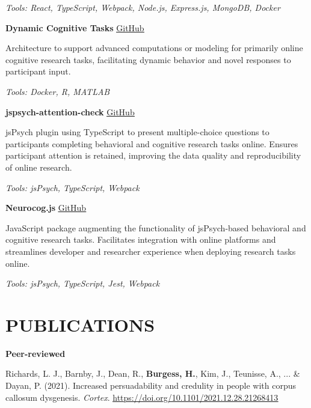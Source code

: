 \documentclass{article}
\begin{document}
  \textit{Tools: React, TypeScript, Webpack, Node.js, Express.js, MongoDB, Docker}

  \medbreak

  \textbf{Dynamic Cognitive Tasks} \hfill \href{https://github.com/Brain-Development-and-Disorders-Lab/mars}{\color{blue}\underline{GitHub}}

  Architecture to support advanced computations or modeling for primarily online cognitive research tasks, facilitating dynamic behavior and novel responses to participant input.

  \textit{Tools: Docker, R, MATLAB}

  \medbreak

  \textbf{jspsych-attention-check} \hfill \href{https://github.com/Brain-Development-and-Disorders-Lab/jspsych-attention-check}{\color{blue}\underline{GitHub}}

  jsPsych plugin using TypeScript to present multiple-choice questions to participants completing behavioral and cognitive research tasks online. Ensures participant attention is retained, improving the data quality and reproducibility of online research.

  \textit{Tools: jsPsych, TypeScript, Webpack}

  \medbreak

  \textbf{Neurocog.js} \hfill \href{https://github.com/Brain-Development-and-Disorders-Lab/Neurocog.js}{\color{blue}\underline{GitHub}}

  JavaScript package augmenting the functionality of jsPsych-based behavioral and cognitive research tasks. Facilitates integration with online platforms and streamlines developer and researcher experience when deploying research tasks online.

  \textit{Tools: jsPsych, TypeScript, Jest, Webpack}

  \section*{\centering\uppercase{Publications}}

  {\large\textbf{Peer-reviewed}}

  Richards, L. J., Barnby, J., Dean, R., \textbf{Burgess, H.}, Kim, J., Teunisse, A., ... \& Dayan, P. (2021). Increased persuadability and credulity in people with corpus callosum dysgenesis. \textit{Cortex}.
  \href{https://doi.org/10.1101/2021.12.28.21268413}{\color{blue}\underline{https://doi.org/10.1101/2021.12.28.21268413}}
\end{document}
